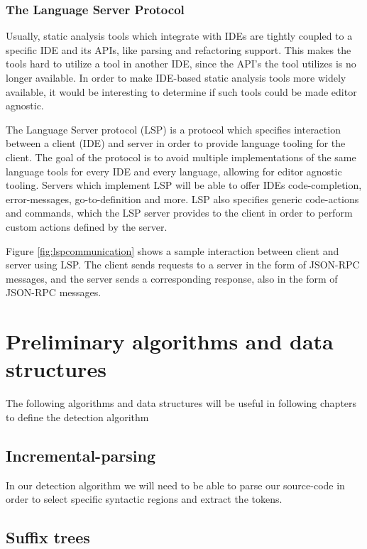 \subsubsection{The Language Server Protocol}

Usually, static analysis tools which integrate with IDEs are tightly coupled to a specific
IDE and its APIs, like parsing and refactoring support. This makes the tools hard to
utilize a tool in another IDE, since the API's the tool utilizes is no longer available.
In order to make IDE-based static analysis tools more widely available, it would be
interesting to determine if such tools could be made editor agnostic.

The Language Server protocol (LSP) is a protocol which specifies interaction between a
client (IDE) and server in order to provide language tooling for the client. The goal of
the protocol is to avoid multiple implementations of the same language tools for every IDE
and every language, allowing for editor agnostic tooling. Servers which implement LSP will
be able to offer IDEs code-completion, error-messages, go-to-definition and more. LSP also
specifies generic code-actions and commands, which the LSP server provides to the client
in order to perform custom actions defined by the server.

Figure \ref{fig:lspcommunication} shows a sample interaction between client and server
using LSP. The client sends requests to a server in the form of JSON-RPC messages, and the
server sends a corresponding response, also in the form of JSON-RPC messages.

\section{Preliminary algorithms and data structures}

The following algorithms and data structures will be useful in following chapters to
define the detection algorithm

\subsection{Incremental-parsing}

In our detection algorithm we will need to be able to parse our source-code in order to select
specific syntactic regions and extract the tokens.

\subsection{Suffix trees}

